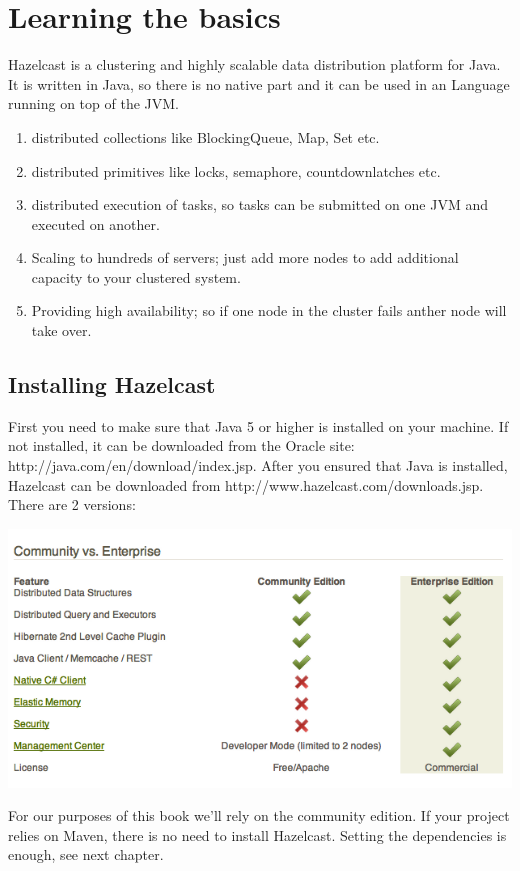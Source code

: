 \chapter{Learning the basics}
Hazelcast is a clustering and highly scalable data distribution platform for Java. It is written in Java, so there is no native part and it can be used in an Language running on top of the JVM.

\begin{enumerate}
  \item distributed collections like BlockingQueue, Map, Set etc.
  \item distributed primitives like locks, semaphore, countdownlatches etc.
  \item distributed execution of tasks, so tasks can be submitted on one JVM and executed 
        on another.
  \item Scaling to hundreds of servers; just add more nodes to add additional capacity to your clustered system.
  \item Providing high availability; so if one node in the cluster fails anther node will take over.
\end{enumerate}

\section{Installing Hazelcast}
First you need to make sure that Java 5 or higher is installed on your machine. If not installed, it can be downloaded from the Oracle site: http://java.com/en/download/index.jsp. After you ensured that Java is installed, Hazelcast can be downloaded from http://www.hazelcast.com/downloads.jsp. There are 2 versions:

\includegraphics[scale=0.60]{hazelcast-editions.png}

For our purposes of this book we'll rely on the community edition. If your project relies on Maven, there is no need to install Hazelcast. Setting the dependencies is enough, see next chapter.

